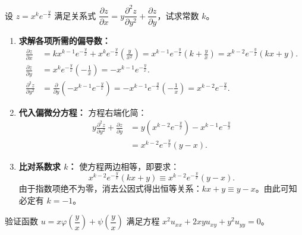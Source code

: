 \documentclass[lang=cn,11pt]{elegantbook}
\begin{document}
\begin{exercise}[偏微分方程待定常数]
设 $z = x^k e^{-\frac{y}{x}}$ 满足关系式 $\dfrac{\partial z}{\partial x} = y\dfrac{\partial^2 z}{\partial y^2} + \dfrac{\partial z}{\partial y}$，试求常数 $k$。
\end{exercise}

\begin{solution}
\begin{enumerate}
  \item \textbf{求解各项所需的偏导数：}
  \begin{align*}
  \frac{\partial z}{\partial x} &= kx^{k-1}e^{-\frac{y}{x}} + x^k e^{-\frac{y}{x}}\left(\frac{y}{x^2}\right) = x^{k-1}e^{-\frac{y}{x}}\left(k + \frac{y}{x}\right) = x^{k-2}e^{-\frac{y}{x}}(kx+y). \\
  \frac{\partial z}{\partial y} &= x^k e^{-\frac{y}{x}}\left(-\frac{1}{x}\right) = -x^{k-1}e^{-\frac{y}{x}}. \\
  \frac{\partial^2 z}{\partial y^2} &= \frac{\partial}{\partial y}\left(-x^{k-1}e^{-\frac{y}{x}}\right) = -x^{k-1}e^{-\frac{y}{x}}\left(-\frac{1}{x}\right) = x^{k-2}e^{-\frac{y}{x}}.
  \end{align*}

  \item \textbf{代入偏微分方程：}
  方程右端化简：
  \begin{align*}
  y\frac{\partial^2 z}{\partial y^2} + \frac{\partial z}{\partial y} &= y\left(x^{k-2}e^{-\frac{y}{x}}\right) - x^{k-1}e^{-\frac{y}{x}} \\
  &= x^{k-2}e^{-\frac{y}{x}}(y - x).
  \end{align*}

  \item \textbf{比对系数求 $k$：}
  使方程两边相等，即要求：
  \[
  x^{k-2}e^{-\frac{y}{x}}(kx+y) \equiv x^{k-2}e^{-\frac{y}{x}}(y-x).
  \]
  由于指数项绝不为零，消去公因式得出恒等关系：$kx+y \equiv y-x$。由此可知必定有 $k = -1$。
\end{enumerate}
\end{solution}

\begin{exercise}[验证偏微分方程]
验证函数 $u = x\varphi\left(\dfrac{y}{x}\right) + \psi\left(\dfrac{y}{x}\right)$ 满足方程 $x^2u_{xx} + 2xyu_{xy} + y^2u_{yy} = 0$。
\end{exercise}
\end{document}
